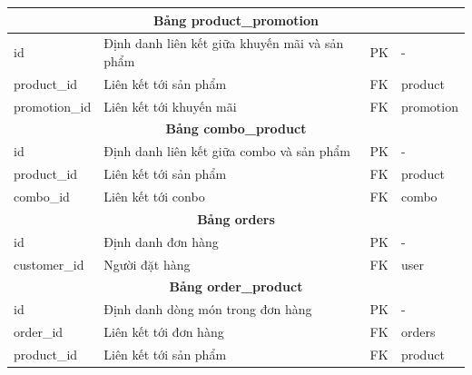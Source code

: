 \begin{longtable}{|l|p{6cm}|l|l|}
	\multicolumn{4}{|c|}{\textbf{Bảng product\_promotion}}                                                                  \\
	\hline
	id                      & Định danh liên kết giữa khuyến mãi và sản phẩm & PK                 & -                       \\
	product\_id             & Liên kết tới sản phẩm                          & FK                 & product                 \\
	promotion\_id           & Liên kết tới khuyến mãi                        & FK                 & promotion               \\
	\hline

	\multicolumn{4}{|c|}{\textbf{Bảng combo\_product}}                                                                      \\
	\hline
	id                      & Định danh liên kết giữa combo và sản phẩm      & PK                 & -                       \\
	product\_id             & Liên kết tới sản phẩm                          & FK                 & product                 \\
	combo\_id               & Liên kết tới conbo                             & FK                 & combo                   \\
	\hline

	\multicolumn{4}{|c|}{\textbf{Bảng orders}}                                                                              \\
	\hline
	id                      & Định danh đơn hàng                             & PK                 & -                       \\
	customer\_id            & Người đặt hàng                                 & FK                 & user                    \\
	\hline

	\multicolumn{4}{|c|}{\textbf{Bảng order\_product}}                                                                      \\
	\hline
	id                      & Định danh dòng món trong đơn hàng              & PK                 & -                       \\
	order\_id               & Liên kết tới đơn hàng                          & FK                 & orders                  \\
	product\_id             & Liên kết tới sản phẩm                          & FK                 & product                 \\
	\hline


\end{longtable}
